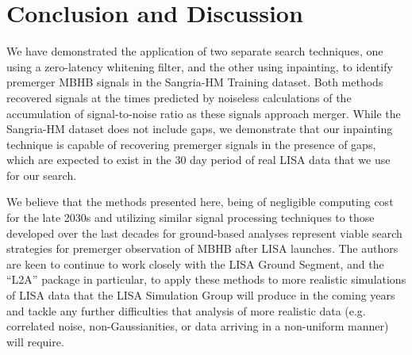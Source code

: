 \section{Conclusion and Discussion}
\label{sec:conclusion}

We have demonstrated the application of two separate search techniques, one using a zero-latency
whitening filter, and the other using inpainting, to identify premerger \ac{MBHB} signals in the Sangria-HM Training dataset.
Both methods recovered signals at the times predicted by noiseless calculations of the accumulation of signal-to-noise ratio as these signals approach merger.
While the Sangria-HM dataset does not include gaps, we demonstrate that our inpainting technique is capable of recovering premerger signals in the presence of gaps, which are expected to exist in the 30 day period of real LISA data that we use for our search.

We believe that the methods presented here, being of negligible computing cost for the late 2030s and utilizing similar signal processing techniques to those developed over the last decades for ground-based analyses represent viable search strategies for premerger observation of \ac{MBHB} after LISA launches.
The authors are keen to continue to work closely with the LISA Ground Segment, and the ``L2A'' package in particular, to apply these methods to more realistic simulations of LISA data that the LISA Simulation Group will produce in the coming years and tackle any further difficulties that analysis of more realistic data (e.g. correlated noise, non-Gaussianities, or data arriving in a non-uniform manner) will require.